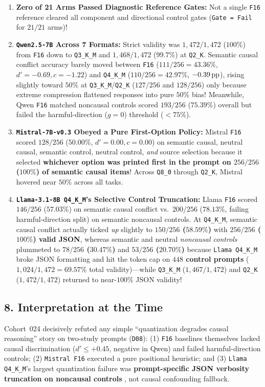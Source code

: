 \begin{enumerate}
  \item \textbf{Zero of 21 Arms Passed Diagnostic Reference Gates:} Not a single \texttt{F16} reference cleared all component and directional control gates (\texttt{Gate = Fail} for $21/21$ arms)!
  \item \textbf{\texttt{Qwen2.5-7B} Across 7 Formats:} Strict validity was $1{,}472/1{,}472$ ($100\%$) from \texttt{F16} down to \texttt{Q3\_K\_M} and $1{,}468/1{,}472$ ($99.7\%$) at \texttt{Q2\_K}. Semantic causal conflict accuracy barely moved between \texttt{F16} ($111/256 = 43.36\%$, $d' = -0.69, c = -1.22$) and \texttt{Q4\_K\_M} ($110/256 = 42.97\%$, $-0.39\,\mathrm{pp}$), rising slightly toward $50\%$ at \texttt{Q3\_K\_M}/\texttt{Q2\_K} ($127/256$ and $128/256$) only because extreme compression flattened responses into pure $50\%$ bias! Meanwhile, Qwen \texttt{F16} matched noncausal controls scored $193/256$ ($75.39\%$) overall but failed the harmful-direction ($g=0$) threshold ($<75\%$).
  \item \textbf{\texttt{Mistral-7B-v0.3} Obeyed a Pure First-Option Policy:} Mistral \texttt{F16} scored $128/256$ ($50.00\%$, $d'=0.00, c=0.00$) on semantic causal, neutral causal, semantic control, neutral control, \emph{and} source selection because it selected \textbf{whichever option was printed first in the prompt on $256/256$ ($100\%$) of semantic causal items}! Across \texttt{Q8\_0} through \texttt{Q2\_K}, Mistral hovered near $50\%$ across all tasks.
  \item \textbf{\texttt{Llama-3.1-8B Q4\_K\_M}'s Selective Control Truncation:} Llama \texttt{F16} scored $146/256$ ($57.03\%$) on semantic causal conflict vs.\ $200/256$ ($78.13\%$, failing harmful-direction split) on semantic noncausal controls. At \texttt{Q4\_K\_M}, semantic causal conflict actually ticked \emph{up} slightly to \textbf{$150/256$ ($58.59\%$)} with \textbf{$256/256$ ($100\%$) valid JSON}, whereas semantic and neutral \emph{noncausal controls} plummeted to \textbf{$78/256$ ($30.47\%$)} and \textbf{$53/256$ ($20.70\%$)} because \texttt{Llama Q4\_K\_M} broke JSON formatting and hit the token cap on \textbf{$448$ control prompts} ($1{,}024/1{,}472 = 69.57\%$ total validity)---while \texttt{Q3\_K\_M} ($1{,}467/1{,}472$) and \texttt{Q2\_K} ($1{,}472/1{,}472$) returned to near-$100\%$ JSON validity!
\end{enumerate}

\subsection*{8. Interpretation at the Time}
Cohort~024 decisively refuted any simple ``quantization degrades causal reasoning'' story on two-study prompts (\texttt{D08}): (1) \texttt{F16} baselines themselves lacked causal discrimination ($d' \le +0.45$, negative in Qwen) and failed harmful-direction controls; (2) \texttt{Mistral F16} executed a pure positional heuristic; and (3) \texttt{Llama Q4\_K\_M}'s largest quantization failure was \textbf{prompt-specific JSON verbosity truncation on noncausal controls} \citep{lian2026inflates}, not causal confounding fallback.

